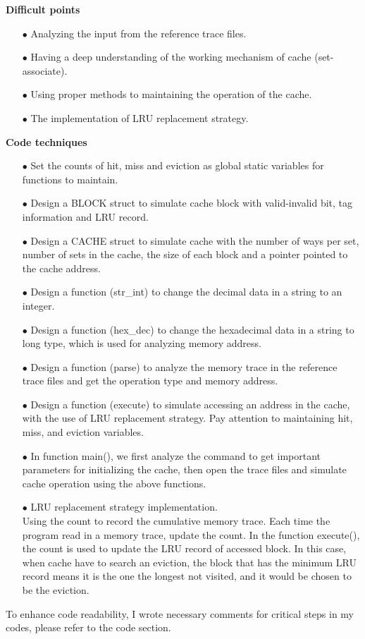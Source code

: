 \documentclass{article}
\begin{document}
\noindent\textbf{Difficult points}
\begin{itemize}
\item[$\bullet$]Analyzing the input from the reference trace files.
\item[$\bullet$]Having a deep understanding of the working mechanism of cache (set-associate).
\item[$\bullet$]Using proper methods to maintaining the operation of the cache.
\item[$\bullet$]The implementation of LRU replacement strategy.
\end{itemize}
\textbf{Code techniques}
\begin{itemize}
\item[$\bullet$]Set the counts of hit, miss and eviction as global static variables for functions to maintain.
\item[$\bullet$]Design a BLOCK struct to simulate cache block with valid-invalid bit, tag information and LRU record.
\item[$\bullet$]Design a CACHE struct to simulate cache with the number of ways per set, number of sets in the cache, the size of each block and a pointer pointed to the cache address.
\item[$\bullet$]Design a function (str\_int) to change the decimal data in a string to an integer.
\item[$\bullet$]Design a function (hex\_dec) to change the hexadecimal data in a string to long type, which is used for analyzing memory address.
\item[$\bullet$]Design a function (parse) to analyze the memory trace in the reference trace files and get the operation type and memory address.
\item[$\bullet$]Design a function (execute) to simulate accessing an address in the cache, with the use of LRU replacement strategy. Pay attention to maintaining hit, miss, and eviction variables.
\item[$\bullet$]In function main(), we first analyze the command to get important parameters for initializing the cache, then open the trace files and simulate cache operation using the above functions.
\item[$\bullet$]LRU replacement strategy implementation. \\
Using the count to record the cumulative memory trace. Each time the program read in a memory trace, update the count. In the function execute(), the count is used to update the LRU record of accessed block. In this case, when cache have to search an eviction, the block that has the minimum LRU record means it is the one the longest not visited, and it would be chosen to be the eviction.
\end{itemize}
To enhance code readability, I wrote necessary comments for critical steps in my codes, please refer to the code section.
 
\end{document}

